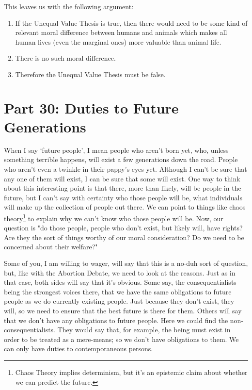 This leaves us with the following argument: 

\begin{enumerate}
\item If the Unequal Value Thesis is true, then there would need to be some kind of relevant moral difference between humans and animals which makes all human lives (even the marginal ones) more valuable than animal life. 
\item There is no such moral difference. 
\item Therefore the Unequal Value Thesis must be false. 
\end{enumerate}

\chapter{Part 30: Duties to Future Generations}
When I say ‘future people’, I mean people who aren’t born yet, who, unless something terrible happens, will exist a few generations down the road. People who aren’t even a twinkle in their pappy’s eyes yet. Although I can’t be sure that any one of them will exist, I can be sure that some will exist. One way to think about this interesting point is that there, more than  likely, will be people in the future, but I can't say with certainty who those people will be, what individuals will make up the collection of people out there. We can point to things like chaos theory\footnote{Chaos Theory implies determinism, but it's an epistemic claim about whether we can predict the future.} to explain why we can't know who those people will be.  Now, our question is "do those people, people who don't exist, but likely will, have rights? Are they the sort of things worthy of our moral consideration? Do we need to be concerned about their welfare?"

Some of you, I am willing to wager, will say that this is a no-duh sort of question, but, like with the Abortion Debate, we need to look at the reasons. Just as in that case, both sides will say that it's obvious. Some say, the consequentialists being the strongest voices there, that we have the same obligations to future people as we do currently existing people. Just because they don't exist, they will, so we need to ensure that the best future is there for them. Others will say that we don't have any obligations to future people. Here we could find the non-consequentialists. They would say that, for example, the being must exist in order to be treated as a mere-means; so we don't have obligations to them. We can only have duties to contemporaneous persons.

